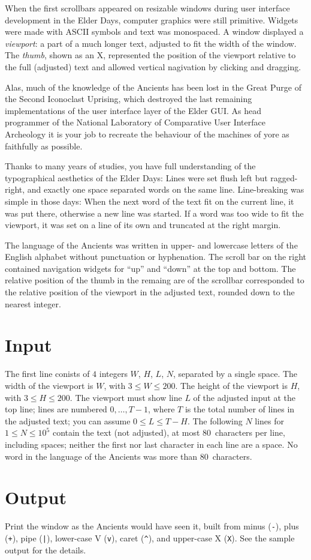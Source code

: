 

When the first scrollbars appeared on resizable windows during user interface development in the Elder Days, computer graphics were still primitive.
Widgets were made with ASCII symbols and text was monospaced.
A window displayed a \emph{viewport}: a part of a much longer text, adjusted to fit the width of the window.
The \emph{thumb}, shown as an X, represented the position of the viewport relative to the full (adjusted) text and allowed vertical nagivation by clicking and dragging.

Alas, much of the knowledge of the Ancients has been lost in the Great Purge of the Second Iconoclast Uprising, which destroyed the last remaining implementations of the user interface layer of the Elder GUI. 
As head programmer of the National Laboratory of Comparative User Interface Archeology it is your job to recreate the behaviour of the machines of yore as faithfully as possible.

Thanks to many years of studies, you have full understanding of the typographical aesthetics of the Elder Days:
Lines were set flush left but ragged-right, and exactly one space separated words on the same line. 
Line-breaking was simple in those days:
When the next word of the text fit on the current line, it was put there, otherwise a new line was started.
If a word was too wide to fit the viewport, it was set on a line of its own and truncated at the right margin.

The language of the Ancients was written in upper- and lowercase letters of the English alphabet without punctuation or hyphenation.
The scroll bar on the right contained navigation widgets for ``up'' and ``down'' at the top and bottom. 
The relative position of the thumb in the remaing are of the scrollbar corresponded to the relative position of the viewport in the adjusted text, rounded down to the nearest integer.


\section*{Input}

The first line conists of $4$ integers $W$, $H$, $L$, $N$, separated by a single space.
The width of the viewport is $W$, with $3\leq W\leq 200$.
The height of the viewport is $H$, with $3\leq H\leq 200$.
The viewport must show line $L$ of the adjusted input at the top line; lines are numbered $0,\ldots, T-1$, where $T$ is the total number of lines in the adjusted text; you can assume $0\leq L \leq T-H$.
The following $N$ lines for $1\leq N\leq 10^5$ contain the text (not adjusted), at most 80~characters per line, including spaces; neither the first nor last character in each line are a space. 
No word in the language of the Ancients was more than 80~characters.


\section*{Output}

Print the window as the Ancients would have seen it, built from minus (\verb!-!), plus (\verb!+!), pipe (\verb!|!), lower-case V (\verb!v!), caret (\verb!^!), and upper-case X (\verb!X!).
See the sample output for the details.
